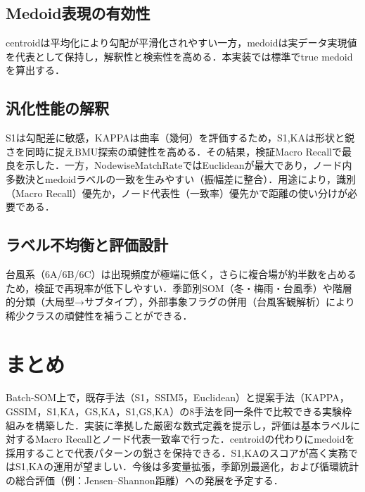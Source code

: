 \documentclass{jarticle}
\theoremstyle{definition}
\begin{document}
\subsection{Medoid表現の有効性}
centroidは平均化により勾配が平滑化されやすい一方，medoidは実データ実現値を代表として保持し，解釈性と検索性を高める．本実装では標準でtrue medoidを算出する．

\subsection{汎化性能の解釈}
S1は勾配差に敏感，KAPPAは曲率（幾何）を評価するため，S1,KAは形状と鋭さを同時に捉えBMU探索の頑健性を高める．その結果，検証Macro Recallで最良を示した．一方，NodewiseMatchRateではEuclideanが最大であり，ノード内多数決とmedoidラベルの一致を生みやすい（振幅差に整合）．用途により，識別（Macro Recall）優先か，ノード代表性（一致率）優先かで距離の使い分けが必要である．

\subsection{ラベル不均衡と評価設計}
台風系（6A/6B/6C）は出現頻度が極端に低く，さらに複合場が約半数を占めるため，検証で再現率が低下しやすい．季節別SOM（冬・梅雨・台風季）や階層的分類（大局型→サブタイプ），外部事象フラグの併用（台風客観解析）により稀少クラスの頑健性を補うことができる．

\section{まとめ}
Batch-SOM上で，既存手法（S1，SSIM5，Euclidean）と提案手法（KAPPA，GSSIM，S1,KA，GS,KA，S1,GS,KA）の8手法を同一条件で比較できる実験枠組みを構築した．実装に準拠した厳密な数式定義を提示し，評価は基本ラベルに対するMacro Recallとノード代表一致率で行った．centroidの代わりにmedoidを採用することで代表パターンの鋭さを保持できる．S1,KAのスコアが高く実務ではS1,KAの運用が望ましい．今後は多変量拡張，季節別最適化，および循環統計の総合評価（例：Jensen–Shannon距離）への発展を予定する．



\end{document}
